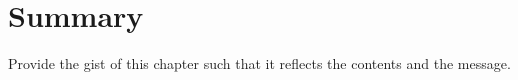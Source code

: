 



\section{Summary}

Provide the gist of this chapter such that it reflects the contents and the message.